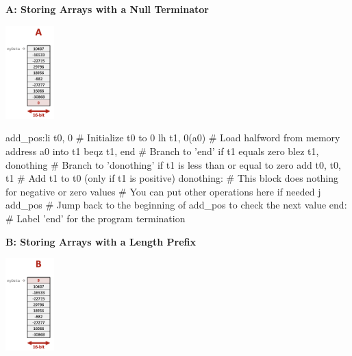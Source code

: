\textbf{A: Storing Arrays with a Null Terminator}\\
\begin{center}
    \includegraphics[width=0.14\textwidth]{chapters/chapter1d/images/A.png}
\end{center}

\begin{center}
\begin{assembly}
add_pos:li t0, 0         # Initialize t0 to 0
        lh t1, 0(a0)     # Load halfword from memory address a0 into t1
        beqz t1, end     # Branch to 'end' if t1 equals zero
        blez t1, donothing  # Branch to 'donothing' if t1 is less than or equal to zero
        add t0, t0, t1   # Add t1 to t0 (only if t1 is positive)
donothing:               # This block does nothing for negative or zero values
# You can put other operations here if needed
        j add_pos        # Jump back to the beginning of add_pos to check the next value
end:                     # Label 'end' for the program termination
\end{assembly}
\end{center}
\textbf{B: Storing Arrays with a Length Prefix} \\
\begin{center}
    \includegraphics[width=0.14\textwidth]{chapters/chapter1d/images/B.png}
\end{center}

